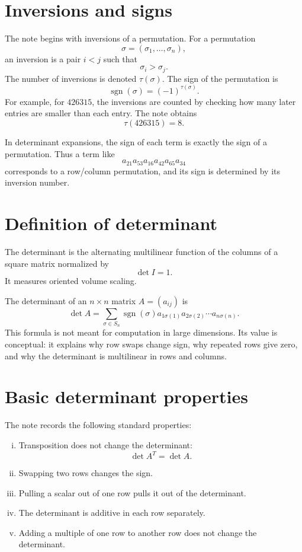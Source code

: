 
\section{Inversions and signs}

The note begins with inversions of a permutation.  For a permutation
\[
  \sigma=(\sigma_1,\ldots,\sigma_n),
\]
an inversion is a pair \(i<j\) such that
\[
  \sigma_i>\sigma_j.
\]
The number of inversions is denoted \(\tau(\sigma)\).  The sign of the permutation is
\[
  \operatorname{sgn}(\sigma)=(-1)^{\tau(\sigma)}.
\]
For example, for \(426315\), the inversions are counted by checking how many later entries are smaller than each entry.  The note obtains
\[
  \tau(426315)=8.
\]

In determinant expansions, the sign of each term is exactly the sign of a permutation.  Thus a term like
\[
  a_{21}a_{53}a_{16}a_{42}a_{65}a_{34}
\]
corresponds to a row/column permutation, and its sign is determined by its inversion number.

\section{Definition of determinant}

\begin{definition}[Determinant]
The determinant is the alternating multilinear function of the columns of a square matrix normalized by
\[
  \det I=1.
\]
It measures oriented volume scaling.
\end{definition}


The determinant of an \(n\times n\) matrix \(A=(a_{ij})\) is
\[
  \det A=\sum_{\sigma\in S_n}\operatorname{sgn}(\sigma)
  a_{1\sigma(1)}a_{2\sigma(2)}\cdots a_{n\sigma(n)}.
\]
This formula is not meant for computation in large dimensions.  Its value is conceptual: it explains why row swaps change sign, why repeated rows give zero, and why the determinant is multilinear in rows and columns.

\section{Basic determinant properties}

The note records the following standard properties:
\begin{enumerate}[(i)]
  \item Transposition does not change the determinant:
  \[
    \det A^T=\det A.
  \]
  \item Swapping two rows changes the sign.
  \item Pulling a scalar out of one row pulls it out of the determinant.
  \item The determinant is additive in each row separately.
  \item Adding a multiple of one row to another row does not change the determinant.

\end{enumerate}

